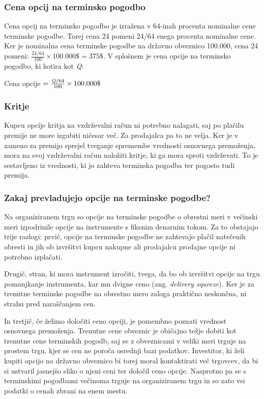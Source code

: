 \documentclass[a4paper]{article}
\begin{document}
\subsubsection{Cena opcij na terminsko pogodbo}
Cena opcij na terminsko pogodbo je izražena v 64-inah procenta nominalne cene terminske pogodbe. Torej cena 24 pomeni 24/64
enega procenta nominalne cene. Ker je nominalna cena terminske pogodbe na državno obveznico 100.000\textdollar, cena 24 pomeni:
\(\frac{24/64}{100} \times 100.000\$ = 375\$\). V splošnem je cena opcije na terminsko pogodbo, ki kotira kot \textit{Q}:
\begin{center}
    Cena opcije $ = \frac{\textit{\text{Q}}/64}{100} \times 100.000\$$
\end{center}

\subsubsection{Kritje}
Kupcu opcije kritja na vzdrževalni račun ni potrebno nalagati, saj po plačilu premije ne more izgubiti ničesar več. Za prodajalca pa to
ne velja. Ker je v zameno za premijo sprejel tveganje spremembe vrednosti osnovnega premoženja, mora na svoj vzdrževalni račun
naložiti kritje, ki ga mora sproti vzdrževati. To je sestavljeno iz vrednosti, ki jo zahteva terminska pogodba ter pogosto tudi premija.

\subsubsection{Zakaj prevladujejo opcije na terminske pogodbe?} \label{futuresvsphysicals}
Na organiziranem trgu so opcije na terminske pogodbe o obrestni meri v večinski meri izpodrinile opcije na instrumente s fiksnim
denarnim tokom. Za to obstajajo trije razlogi: prvič, opcije na terminske pogodbe ne zahtevajo plačil natečenih obresti in jih ob izvršitvi kupcu
nakupne ali prodajalcu prodajne opcije ni potrebno izplačati.

Drugič, stran, ki mora instrument izročiti, tvega, da bo ob izvršitvi opcije na trgu pomanjkanje instrumenta, kar mu dvigne ceno (ang. \textit{delivery squeeze}).
Ker je za trenutne terminske pogodbe na obrestno mero zaloga praktično neskončna, ni strahu pred naraščanjem cen. 

In tretjič, če želimo določiti ceno opciji, je pomembno poznati vrednost osnovnega premoženja.
Trenutne cene obveznic je običajno težje dobiti kot trenutne cene terminskih pogodb, saj se z obveznicami v veliki meri trguje na prostem trgu, kjer
se cen ne poroča osrednji bazi podatkov. Investitor, ki želi kupiti opcijo na državno obveznico bi torej moral kontaktirati več trgovcev, 
da bi si ustvaril jasnejšo sliko o njeni ceni ter določil ceno opcije. Nasprotno pa se s terminskimi pogodbami večinoma trguje na organiziranem trgu in so zato vsi 
podatki o cenah zbrani na enem mestu. 
\end{document}
